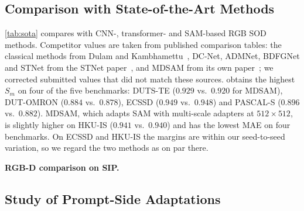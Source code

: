 \subsection{Comparison with State-of-the-Art Methods}
\label{sec:sota}



\begin{revpar}
\cref{tab:sota} compares \methodname{} with CNN-, transformer- and SAM-based RGB
SOD methods. Competitor values are taken from published comparison tables: the
classical methods from Dulam and Kambhamettu~\cite{dulam2025soddcnet}, DC-Net,
ADMNet, BDFGNet and STNet from the STNet paper~\cite{sod_stnet}, and MDSAM from its
own paper~\cite{mdsam2024}; we corrected submitted values that did not match these
sources. \methodname{} obtains the highest $S_m$ on four of the five benchmarks:
DUTS-TE ($0.929$ vs.\ $0.920$ for MDSAM), DUT-OMRON ($0.884$ vs.\ $0.878$), ECSSD
($0.949$ vs.\ $0.948$) and PASCAL-S ($0.896$ vs.\ $0.882$). MDSAM, which adapts SAM
with multi-scale adapters at $512{\times}512$, is slightly higher on HKU-IS
($0.941$ vs.\ $0.940$) and has the lowest MAE on four benchmarks. On ECSSD and
HKU-IS the margins are within our seed-to-seed variation, so we regard the two
methods as on par there.
\end{revpar}

\noindent\textbf{RGB-D comparison on SIP.}


\subsection{Study of Prompt-Side Adaptations}
\label{sec:study_prompt}



